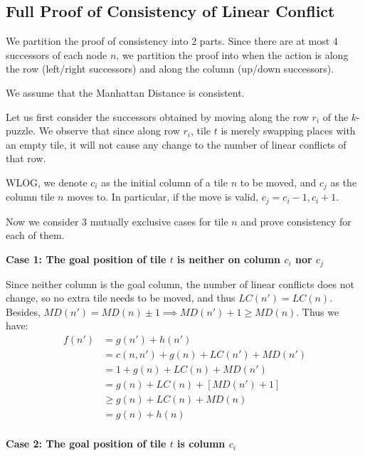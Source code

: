 \documentclass{llncs}
\begin{document}
\subsection{Full Proof of Consistency of Linear Conflict}
We partition the proof of consistency into 2 parts. Since there are at most 4 successors of each node $n$, we partition the proof into when the action is along the row (left/right successors) and along the column (up/down successors).

We assume that the Manhattan Distance is consistent.

Let us first consider the successors obtained by moving along the row $r_i$ of the $k$-puzzle. We observe that since along row $r_i$, tile $t$ is merely swapping places with an empty tile, it will not cause any change to the number of linear conflicts of that row.

WLOG, we denote $c_i$ as the initial column of a tile $n$ to be moved, and $c_j$ as the column tile $n$ moves to. In particular, if the move is valid, $c_j = c_i - 1, c_i + 1$.

Now we consider 3 mutually exclusive cases for tile $n$ and prove consistency for each of them.

\textbf{Case 1: The goal position of tile $t$ is neither on column $c_i$ nor $c_j$}

Since neither column is the goal column, the number of linear conflicts does not change, so no extra tile needs to be moved, and thus $LC(n') = LC(n)$. Besides, $MD(n') = MD(n) \pm 1 \implies MD(n') + 1 \geq MD(n)$. Thus we have:
\begin{align}
    f(n') \nonumber
    	&= g(n') + h(n') \\\nonumber
        &= c(n,n') + g(n) + LC(n') + MD(n') \\\nonumber
        &= 1 + g(n) + LC(n) + MD(n') \\\nonumber
        &= g(n) + LC(n) + [MD(n') + 1] \\\nonumber
        &\geq g(n) + LC(n) + MD(n) \\\nonumber
        &= g(n) + h(n) \\\nonumber
\end{align}

\textbf{Case 2: The goal position of tile $t$ is column $c_i$}
\end{document}
